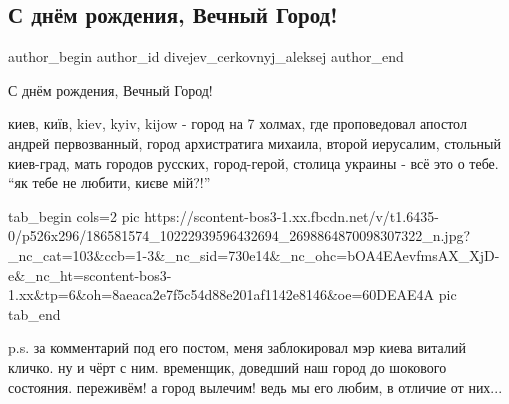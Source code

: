  
 
 
 
 
 
\subsection{С днём рождения, Вечный Город!}
\label{sec:29_05_2021.fb.divejev_cerkovnyj_aleksej.1.vechnyj_gorod_birthday_kiev}
\ifcmt
 author_begin
   author_id divejev_cerkovnyj_aleksej
 author_end
\fi

С днём рождения, Вечный Город!

киев, київ, kiev, kyiv, kijow - город на 7 холмах, где проповедовал апостол
андрей первозванный, город архистратига михаила, второй иерусалим, стольный
киев-град, мать городов русских, город-герой, столица украины - всё это о тебе.
\enquote{як тебе не любити, києве мій?!}

\ifcmt
  tab_begin cols=2
     pic https://scontent-bos3-1.xx.fbcdn.net/v/t1.6435-0/p526x296/186581574_10222939596432694_2698864870098307322_n.jpg?_nc_cat=103&ccb=1-3&_nc_sid=730e14&_nc_ohc=bOA4EAevfmsAX_XjD-e&_nc_ht=scontent-bos3-1.xx&tp=6&oh=8aeaca2e7f5c54d88e201af1142e8146&oe=60DEAE4A
     pic 
  tab_end
\fi

p.s. за комментарий под его постом, меня заблокировал мэр киева виталий кличко.
ну и чёрт с ним. временщик, доведший наш город до шокового состояния.
переживём! а город вылечим! ведь мы его любим, в отличие от них...
